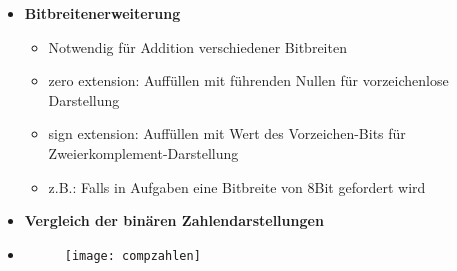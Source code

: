 \begin{itemize}
\begin{itemize}
\begin{itemize}
		\end{itemize}
	\end{itemize}
	
	\pagebreak	
	
\item \textbf{Bitbreitenerweiterung}
	\begin{itemize}
	\item Notwendig für Addition verschiedener Bitbreiten
	\item zero extension: Auffüllen mit führenden Nullen für vorzeichenlose Darstellung
	\item sign extension: Auffüllen mit Wert des Vorzeichen-Bits für Zweierkomplement-Darstellung
	\item z.B.: Falls in Aufgaben eine Bitbreite von 8Bit gefordert wird
	\end{itemize}

\item \textbf{Vergleich der binären Zahlendarstellungen}
\item[] \begin{figure}[H]
			\begin{center}
			\texttt{[image: compzahlen]}
			\end{center}
		\end{figure}

\end{itemize}

